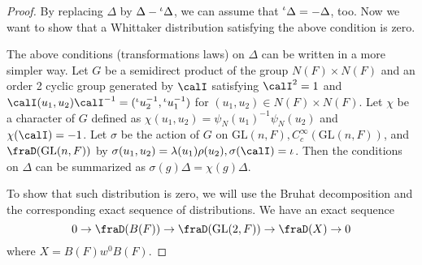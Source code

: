 \documentclass{article}
\newcommand{\pre}[1]{\prescript{#1}{}}
\newcommand{\GL}{\mathrm{GL}}
\begin{document}
\begin{proof}
By replacing $\Delta$ by $\Delta - \pre{\iota}{}\Delta$, we can assume that $\pre{\iota}\Delta = -\Delta$, too. Now we want to show that a Whittaker distribution satisfying the above condition is zero. 

The above conditions (transformations laws) on $\Delta$ can be written in a more simpler way. Let $G$ be a semidirect product of the group $N(F)\times N(F)$ and an order 2 cyclic group generated by $\calI$ satisfying $\calI^{2} = 1$ and $\calI(u_{1}, u_{2})\calI^{-1} = (\pre{\iota}{}u_{2}^{-1}, \pre{\iota}{}u_{1}^{-1})$ for $(u_{1}, u_{2})\in N(F)\times N(F)$. 
Let $\chi$ be a character of $G$ defined as $\chi(u_{1}, u_{2})= \psi_{N}(u_{1})^{-1}\psi_{N}(u_{2})$ and $\chi(\calI) = -1$. 
Let $\sigma$ be the action of $G$ on $\GL(n, F), C_{c}^{\infty}(\GL(n, F))$, and $\fraD(\GL(n, F))$ by $\sigma(u_{1}, u_{2}) = \lambda(u_{1})\rho(u_{2}), \sigma(\calI) =\iota$. Then the conditions on $\Delta$ can be summarized as $\sigma(g) \Delta = \chi(g)\Delta$. 

To show that such distribution is zero, we will use the Bruhat decomposition and the corresponding exact sequence of distributions. We have an exact sequence
$$
0 \to \fraD(B(F)) \to \fraD(\GL(2, F)) \to \fraD(X) \to 0
$$
where $X = B(F)w^{0}B(F)$. 


\end{proof}
\end{document}
